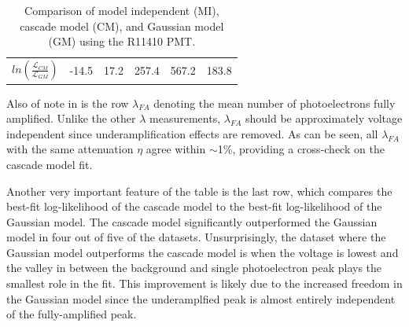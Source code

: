 \begin{table}[t]
{\begin{tabular}{cc|ccccc}
\multicolumn{2}{c|}{$ln \left( \frac{\mathcal{L}_{CM}}{\mathcal{L}_{GM}} \right)$} & -14.5 & 17.2 & 257.4 & 567.2 & 183.8 \\



\end{tabular}
}
\caption{Comparison of model independent (MI), cascade model (CM), and Gaussian model (GM) using the R11410 PMT.}
\label{tab-1}
\end{table}



Also of note in  is the row $\lambda_{FA}$ denoting the mean number of photoelectrons fully amplified.  Unlike the other $\lambda$ measurements, $\lambda_{FA}$ should be approximately voltage independent since underamplification effects are removed.  As can be seen, all $\lambda_{FA}$ with the same attenuation $\eta$ agree within $\sim$1\%, providing a cross-check on the cascade model fit.

Another very important feature of the table is the last row, which compares the best-fit log-likelihood of the cascade model to the best-fit log-likelihood of the Gaussian model.  The cascade model significantly outperformed the Gaussian model in four out of five of the datasets.  Unsurprisingly, the dataset where the Gaussian model outperforms the cascade model is when the voltage is lowest and the valley in between the background and single photoelectron peak plays the smallest role in the fit.  This improvement is likely due to the increased freedom in the Gaussian model since the underamplfied peak is almost entirely independent of the fully-amplified peak.





